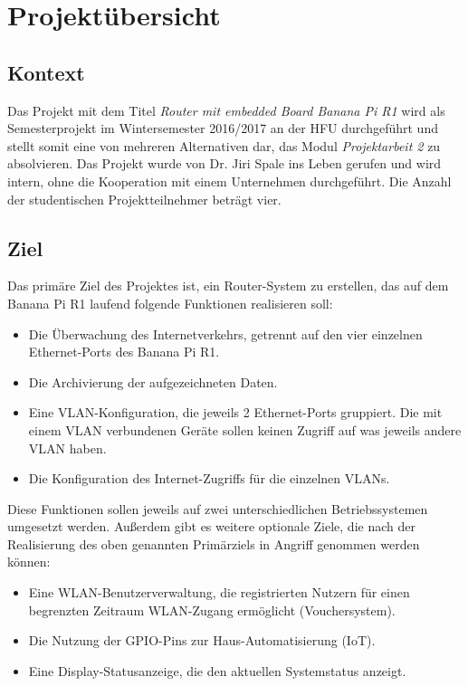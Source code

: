 \chapter{Projektübersicht}

\section{Kontext}
Das Projekt mit dem Titel \textit{Router mit embedded Board Banana Pi R1} wird als Semesterprojekt im Wintersemester 2016/2017 an der \ac{HFU} durchgeführt und stellt somit eine von mehreren Alternativen dar, das Modul  \textit{Projektarbeit 2} zu absolvieren. Das Projekt wurde von Dr. Jiri Spale ins Leben gerufen und wird intern, ohne die Kooperation mit einem Unternehmen durchgeführt. Die Anzahl der studentischen Projektteilnehmer beträgt vier.

\section{Ziel}
Das primäre Ziel des Projektes ist, ein Router-System zu erstellen, das auf dem Banana Pi R1 laufend folgende Funktionen realisieren soll:
\begin{itemize}
	\item Die Überwachung des Internetverkehrs, getrennt auf den vier einzelnen Ethernet-Ports des Banana Pi R1.
	\item Die Archivierung der aufgezeichneten Daten.
	\item Eine \ac{VLAN}-Konfiguration, die jeweils 2 Ethernet-Ports gruppiert. Die mit einem \ac{VLAN} verbundenen Geräte sollen keinen Zugriff auf was jeweils andere \ac{VLAN} haben.
	\item Die Konfiguration des Internet-Zugriffs für die einzelnen \ac{VLAN}s.
\end{itemize}
Diese Funktionen sollen jeweils auf zwei unterschiedlichen Betriebssystemen umgesetzt werden. Außerdem gibt es weitere optionale Ziele, die nach der Realisierung des oben genannten Primärziels in Angriff genommen werden können:
\begin{itemize}
	\item Eine WLAN-Benutzerverwaltung, die registrierten Nutzern für einen begrenzten Zeitraum WLAN-Zugang ermöglicht (Vouchersystem).
	\item Die Nutzung der GPIO-Pins zur Haus-Automatisierung (\ac{IoT}).
	\item Eine Display-Statusanzeige, die den aktuellen Systemstatus anzeigt.
\end{itemize}


